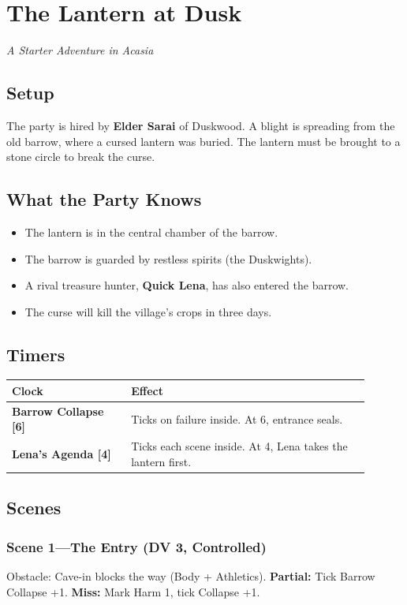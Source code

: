 \documentclass[10pt,twocolumn]{article} %
\begin{document}
\section{The Lantern at Dusk}
\textit{A Starter Adventure in Acasia}

\subsection{Setup}
The party is hired by \textbf{Elder Sarai} of Duskwood. A blight is spreading from the old barrow, where a cursed lantern was buried. The lantern must be brought to a stone circle to break the curse.

\subsection{What the Party Knows}
\begin{itemize}[leftmargin=*]
    \item The lantern is in the central chamber of the barrow.
    \item The barrow is guarded by restless spirits (the Duskwights).
    \item A rival treasure hunter, \textbf{Quick Lena}, has also entered the barrow.
    \item The curse will kill the village's crops in three days.
\end{itemize}

\subsection{Timers}
\begin{coretable}
\begin{tabular}{>{\bfseries}p{0.3\linewidth} p{0.6\linewidth}}
\toprule
\textbf{Clock} & \textbf{Effect} \\
\midrule
Barrow Collapse [6] & Ticks on failure inside. At 6, entrance seals. \\
Lena's Agenda [4] & Ticks each scene inside. At 4, Lena takes the lantern first. \\
\bottomrule
\end{tabular}
\end{coretable}

\subsection{Scenes}
\subsubsection{Scene 1—The Entry (DV 3, Controlled)}
Obstacle: Cave-in blocks the way (Body + Athletics). \textbf{Partial:} Tick Barrow Collapse +1. \textbf{Miss:} Mark Harm 1, tick Collapse +1.
\end{document}
